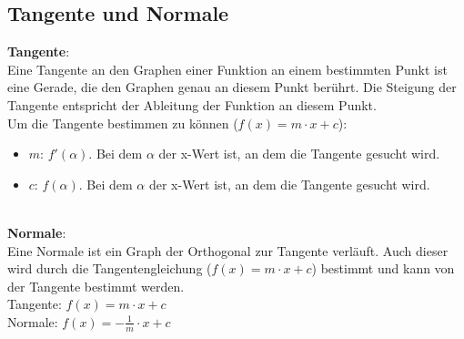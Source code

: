 \subsection{Tangente und Normale}
\label{sec:tangenteundnormale}
\textbf{Tangente}: \\
Eine Tangente an den Graphen einer Funktion an einem bestimmten Punkt ist eine Gerade, 
die den Graphen genau an diesem Punkt berührt. 
Die Steigung der Tangente entspricht der Ableitung der Funktion an diesem Punkt. \\
Um die Tangente bestimmen zu können ($f(x) = m\cdot x + c$):
\begin{itemize}
    \item $m$: $f'(\alpha)$. Bei dem $\alpha$ der x-Wert ist, an dem die Tangente gesucht wird.
    \item $c$: $f(\alpha)$. Bei dem $\alpha$ der x-Wert ist, an dem die Tangente gesucht wird.
\end{itemize} 
\
\\
\textbf{Normale}: \\
Eine Normale ist ein Graph der Orthogonal zur Tangente verläuft. 
Auch dieser wird durch die Tangentengleichung ($f(x) = m\cdot x + c$) bestimmt und kann von der Tangente bestimmt werden. \\
Tangente: $f(x) = m \cdot x + c$ \\
Normale: 
$
f(x) = -\frac{1}{m} \cdot x + c
$
